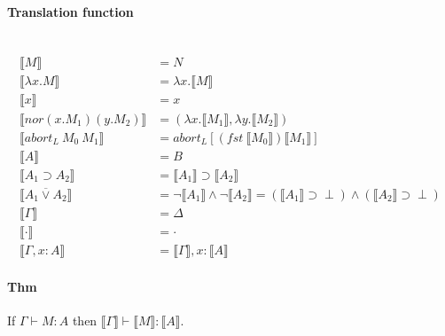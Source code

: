 \documentclass[12 pt]{article}
\begin{document}
       \paragraph{Translation function}~
       \begin{align*}
         \llbracket M \rrbracket & = N
         \\ \llbracket \lambda x. M \rrbracket & = \lambda x. \llbracket M \rrbracket
         \\ \llbracket x \rrbracket & = x
         \\ \llbracket nor (x.M_1) (y.M_2) \rrbracket & = (\lambda x. \llbracket M_1 \rrbracket, \lambda y.\llbracket M_2 \rrbracket)
         \\ \llbracket abort_L\ M_0\ M_1 \rrbracket & = abort_L [(fst\ \llbracket M_0 \rrbracket)\llbracket M_1 \rrbracket]
         \\ \llbracket A \rrbracket & = B
         \\ \llbracket A_1 \supset A_2 \rrbracket & = \llbracket A_1 \rrbracket \supset \llbracket A_2 \rrbracket
         \\ \llbracket A_1 \overline{\lor} A_2 \rrbracket & = \neg \llbracket A_1 \rrbracket \land \neg \llbracket A_2 \rrbracket = (\llbracket A_1 \rrbracket \supset \perp) \land (\llbracket A_2 \rrbracket \supset \perp)
         \\ \llbracket \Gamma \rrbracket & = \Delta
         \\ \llbracket \cdot \rrbracket & = \cdot
         \\ \llbracket \Gamma, x:A \rrbracket & = \llbracket \Gamma \rrbracket, x:\llbracket A \rrbracket
       \end{align*}
       \paragraph{Thm} If $\Gamma \vdash M:A$ then $\llbracket \Gamma
       \rrbracket \vdash \llbracket M \rrbracket: \llbracket A \rrbracket$.
\end{document}
